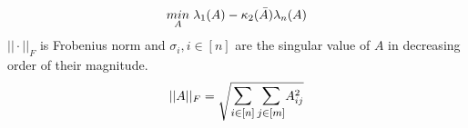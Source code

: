 \begin{equation}
    \underset{A}{min}\hspace{1mm} \lambda_1(A) - \kappa_2 (\Bar{A}) \lambda_n(A)
\end{equation}
$||\cdot||_F$ is Frobenius norm and $\sigma_i, i\in [n]$ are the singular value of $A$ in decreasing order of their magnitude.
\begin{equation} \label{frobenius_norm}
    ||A||_F = \sqrt{ \mathlarger{\sum_{i \in [n]} \sum_{j \in [m]}} A^{2}_{ij}} 
\end{equation}
